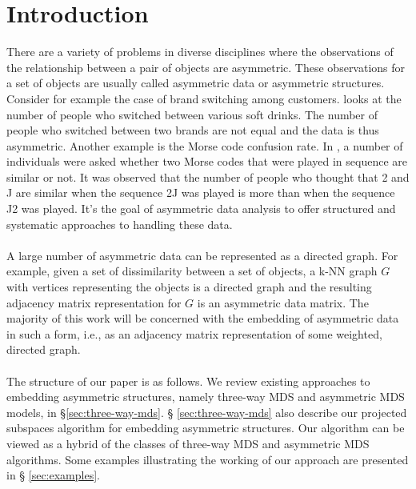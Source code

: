 \documentclass[11pt]{asaproc}
\begin{document}
\section{Introduction}
There are a variety of problems in diverse disciplines where the
observations of the relationship between a pair of objects are
asymmetric. These observations for a set of objects are usually called
asymmetric data or asymmetric structures. Consider for example the
case of brand switching among customers. \citet{desarbo84} looks at
the number of people who switched between various soft drinks. The
number of people who switched between two brands are not equal and the
data is thus asymmetric. Another example is the Morse code confusion
rate. In \citet{rothkopf57}, a number of individuals were asked
whether two Morse codes that were played in sequence are similar or
not. It was observed that the number of people who thought that 2 and
J are similar when the sequence 2J was played is more than when the
sequence J2 was played. It's the goal of asymmetric data analysis to
offer structured and systematic approaches to handling these data. \\
\\
%
\noindent A large number of asymmetric data can be represented as a directed
graph. For example, given a set of dissimilarity between a set of
objects, a k-NN graph $G$ with vertices representing the objects is a
directed graph and the resulting adjacency matrix representation for
$G$ is an asymmetric data matrix. The majority of this work will be
concerned with the embedding of asymmetric data in such a form, i.e.,
as an adjacency matrix representation of some weighted, directed
graph. \\ \\
%
\noindent The structure of our paper is as follows. We review existing
approaches to embedding asymmetric structures, namely three-way MDS
and asymmetric MDS models, in \S \ref{sec:three-way-mds}. \S
\ref{sec:three-way-mds} also describe our projected subspaces algorithm
for embedding asymmetric structures. Our algorithm can be viewed as a
hybrid of the classes of three-way MDS and asymmetric MDS
algorithms. 
Some examples illustrating the working of our approach are presented in \S
\ref{sec:examples}.
%
\end{document}
